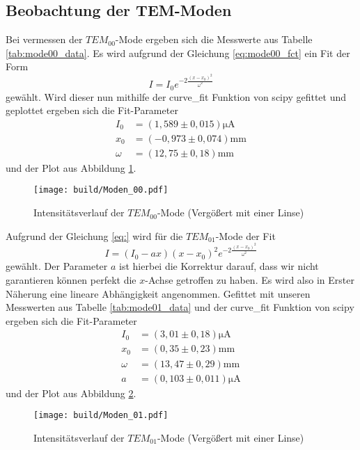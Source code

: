 \subsection{Beobachtung der TEM-Moden}
Bei vermessen der $TEM_{00}$-Mode ergeben sich die Messwerte aus Tabelle \ref{tab:mode00_data}. 
Es wird aufgrund der Gleichung \eqref{eq:mode00_fct} ein Fit der Form
\begin{equation}
  I=I_0e^{-2\frac{(x-x_0)^2}{\omega^2}}
\end{equation}
gewählt. Wird dieser nun mithilfe der curve\_fit Funktion von scipy \cite{scipy} gefittet und geplottet ergeben sich die Fit-Parameter
\begin{align}
  I_0&=(1,589\pm0,015)\si{\micro\ampere}\nonumber\\
  x_0&=(-0,973\pm0,074)\si{\milli\meter}\nonumber\\
  \omega&=(12,75\pm0,18)\si{\milli\meter}
\end{align}
und der Plot aus Abbildung \ref{fig:Mode_00}.
\begin{figure}
  \centering
  \texttt{[image: build/Moden\_00.pdf]}
  \caption{Intensitätsverlauf der $TEM_{00}$-Mode (Vergößert mit einer Linse)}
  \label{fig:Mode_00}
\end{figure}
Aufgrund der Gleichung \eqref{eq:} wird für die $TEM_{01}$-Mode der Fit 
\begin{equation}
  I=(I_0-ax)(x-x_0)^2e^{-2\frac{(x-x_0)^2}{\omega^2}}
\end{equation}
gewählt. Der Parameter $a$ ist hierbei die Korrektur darauf, dass wir nicht garantieren können perfekt die $x$-Achse getroffen zu haben.
Es wird also in Erster Näherung eine lineare Abhängigkeit angenommen.
Gefittet mit unseren Messwerten aus Tabelle \ref{tab:mode01_data} und der curve\_fit Funktion von scipy \cite{scipy} ergeben sich die Fit-Parameter 
\begin{align}
  I_0&=(3,01\pm0,18)\si{\micro\ampere}\nonumber\\
  x_0&=(0,35\pm0,23)\si{\milli\meter}\nonumber\\
  \omega&=(13,47\pm0,29)\si{\milli\meter}\nonumber\\
  a&=(0,103\pm0,011)\si{\micro\ampere}
\end{align}
und der Plot aus Abbildung \ref{fig:Mode_01}.

\begin{figure}
  \centering
  \texttt{[image: build/Moden\_01.pdf]}
  \caption{Intensitätsverlauf der $TEM_{01}$-Mode (Vergößert mit einer Linse)}
  \label{fig:Mode_01}
\end{figure}


